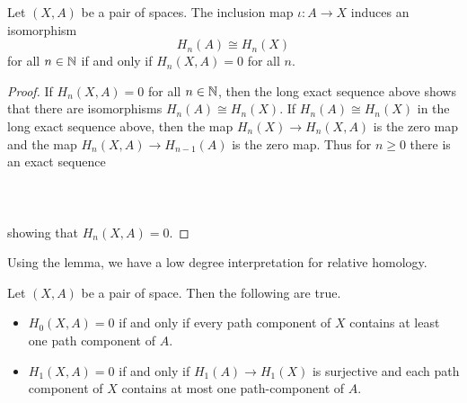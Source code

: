 \documentclass[a4paper]{article}
\begin{document}
\begin{lmm}{}{} Let $(X,A)$ be a pair of spaces. The inclusion map $\iota:A\to X$ induces an isomorphism $$H_n(A)\cong H_n(X)$$ for all $n\in\mathbb{N}$ if and only if $H_n(X,A)=0$ for all $n$. \tcbline
\begin{proof}
If $H_n(X,A)=0$ for all $n\in\mathbb{N}$, then the long exact sequence above shows that there are isomorphisms $H_n(A)\cong H_n(X)$. If $H_n(A)\cong H_n(X)$ in the long exact sequence above, then the map $H_n(X)\to H_n(X,A)$ is the zero map and the map $H_n(X,A)\to H_{n-1}(A)$ is the zero map. Thus for $n\geq 0$ there is an exact sequence \\~\\
\\~\\
showing that $H_n(X,A)=0$. 
\end{proof}
\end{lmm}

Using the lemma, we have a low degree interpretation for relative homology. 

\begin{prp}{}{} Let $(X,A)$ be a pair of space. Then the following are true. 
\begin{itemize}
\item $H_0(X,A)=0$ if and only if every path component of $X$ contains at least one path component of $A$. 
\item $H_1(X,A)=0$ if and only if $H_1(A)\to H_1(X)$ is surjective and each path component of $X$ contains at most one path-component of $A$. 
\end{itemize}
\end{prp}
\end{document}
